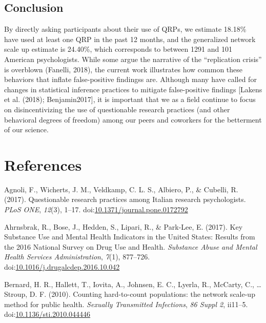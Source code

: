 \documentclass[man]{apa6}
\theoremstyle{definition}
\theoremstyle{definition}
\theoremstyle{definition}
\theoremstyle{remark}
\begin{document}
\subsection{Conclusion}\label{conclusion}

By directly asking participants about their use of QRPs, we estimate
18.18\% have used at least one QRP in the past 12 months, and the
generalized network scale up estimate is 24.40\%, which corresponds to
between 1291 and 101 American psychologists. While some argue the
narrative of the \enquote{replication crisis} is overblown (Fanelli,
2018), the current work illustrates how common these behaviors that
inflate false-positive findingss are. Although many have called for
changes in statistical inference practices to mitigate false-positive
findings {[}Lakens et al. (2018); Benjamin2017{]}, it is important that
we as a field continue to focus on disincentivizing the use of
questionable research practices (and other behavioral degrees of
freedom) among our peers and coworkers for the betterment of our
science.

\newpage

\section{References}\label{references}

\begingroup
\setlength{\parindent}{-0.5in} \setlength{\leftskip}{0.5in}

\hypertarget{refs}{}
\hypertarget{ref-Agnoli2017}{}
Agnoli, F., Wicherts, J. M., Veldkamp, C. L. S., Albiero, P., \&
Cubelli, R. (2017). Questionable research practices among Italian
research psychologists. \emph{PLoS ONE}, \emph{12}(3), 1--17.
doi:\href{https://doi.org/10.1371/journal.pone.0172792}{10.1371/journal.pone.0172792}

\hypertarget{ref-Ahrnsbrak2017}{}
Ahrnsbrak, R., Bose, J., Hedden, S., Lipari, R., \& Park-Lee, E. (2017).
Key Substance Use and Mental Health Indicators in the United States:
Results from the 2016 National Survey on Drug Use and Health.
\emph{Substance Abuse and Mental Health Services Administration},
\emph{7}(1), 877--726.
doi:\href{https://doi.org/10.1016/j.drugalcdep.2016.10.042}{10.1016/j.drugalcdep.2016.10.042}

\hypertarget{ref-Bernard2010}{}
Bernard, H. R., Hallett, T., Iovita, A., Johnsen, E. C., Lyerla, R.,
McCarty, C., \ldots{} Stroup, D. F. (2010). Counting hard-to-count
populations: the network scale-up method for public health.
\emph{Sexually Transmitted Infections}, \emph{86 Suppl 2}, ii11--5.
doi:\href{https://doi.org/10.1136/sti.2010.044446}{10.1136/sti.2010.044446}
\end{document}
